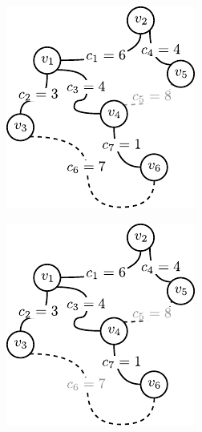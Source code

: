 \begin{figure}[!htbp]
\begin{subfigure}[b]{0.19\textwidth}
		\caption{}
		\label{fig:kruskal:f}
	\end{subfigure}
	\hfill
	\begin{subfigure}[b]{0.19\textwidth}
		\includegraphics[width=\textwidth]{Chapter_I/KRUSKAL-example/g}
		\caption{}
		\label{fig:kruskal:g}
	\end{subfigure}
	\hfill
	\begin{subfigure}[b]{0.19\textwidth}
		\includegraphics[width=\textwidth]{Chapter_I/KRUSKAL-example/h}

\end{subfigure}
\end{figure}
